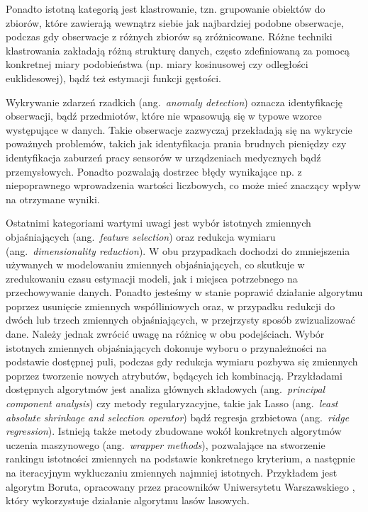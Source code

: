 \documentclass[12pt,a4paper,twoside,openany]{book}
\begin{document}
Ponadto istotną kategorią jest klastrowanie, tzn. grupowanie obiektów do zbiorów, które zawierają wewnątrz siebie jak najbardziej podobne obserwacje, podczas gdy obserwacje z różnych zbiorów są zróżnicowane.  Różne techniki klastrowania zakładają różną strukturę danych, często zdefiniowaną za pomocą konkretnej miary podobieństwa (np. miary kosinusowej czy odległości euklidesowej), bądź też estymacji funkcji gęstości. 

Wykrywanie zdarzeń rzadkich (ang.~\textit{anomaly detection}) oznacza identyfikację obserwacji, bądź przedmiotów, które nie wpasowują się w typowe wzorce występujące w danych. Takie obserwacje zazwyczaj przekładają się na wykrycie poważnych problemów, takich jak identyfikacja prania brudnych pieniędzy czy identyfikacja zaburzeń pracy sensorów w urządzeniach medycznych bądź przemysłowych. Ponadto pozwalają dostrzec błędy wynikające np. z niepoprawnego wprowadzenia wartości liczbowych, co może mieć znaczący wpływ na otrzymane wyniki. 

Ostatnimi kategoriami wartymi uwagi jest wybór istotnych zmiennych objaśniających (ang.~\textit{feature selection}) oraz redukcja wymiaru (ang.~\textit{dimensionality reduction}).  W obu przypadkach dochodzi do zmniejszenia używanych w modelowaniu zmiennych objaśniających, co skutkuje w zredukowaniu czasu estymacji modeli, jak i miejsca potrzebnego na przechowywanie danych. Ponadto jesteśmy w stanie poprawić działanie algorytmu poprzez usunięcie zmiennych współliniowych oraz, w przypadku redukcji do dwóch lub trzech zmiennych objaśniających, w przejrzysty sposób zwizualizować dane. Należy jednak zwrócić uwagę na różnicę w obu podejściach. Wybór istotnych zmiennych objaśniających dokonuje wyboru o przynależności na podstawie dostępnej puli, podczas gdy redukcja wymiaru pozbywa się zmiennych poprzez tworzenie nowych atrybutów, będących ich kombinacją. Przykładami dostępnych algorytmów jest analiza głównych składowych (ang.~\textit{principal component analysis}) czy metody regularyzacyjne, takie jak Lasso (ang.~\textit{least absolute shrinkage and selection operator}) bądź regresja grzbietowa (ang.~\textit{ridge regression}). Istnieją także metody zbudowane wokół konkretnych algorytmów uczenia maszynowego (ang.~\textit{wrapper methods}), pozwalające na stworzenie rankingu istotności zmiennych na podstawie konkretnego kryterium, a następnie na iteracyjnym wykluczaniu zmiennych najmniej istotnych. Przykładem jest algorytm Boruta, opracowany przez pracowników Uniwersytetu Warszawskiego \citep{kursa2010}, który wykorzystuje działanie algorytmu lasów lasowych.
\end{document}
